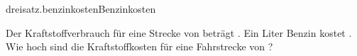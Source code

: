 \begin{exercise}{dreisatz.benzinkosten}{Benzinkosten}
  \ifproblem\problem\par
    Der Kraftstoffverbrauch für eine Strecke von  beträgt .
    Ein Liter Benzin kostet . Wie hoch sind die Kraftstoffkosten für
    eine Fahrstrecke von ?
  \fi
\end{exercise}
